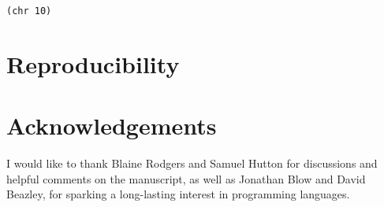 \documentclass[aip,jcp,reprint]{revtex4-1}
\let\tt\texttt
\newcommand\psll{\texttt{psll}\xspace}
\newcommand{\ilpsll}[1]{\lstinline[language=psll,columns=flexible]{#1}}
\begin{document}
\lipsum[11-15]
\ilpsll{(chr 10)}
\section*{Reproducibility}


\section*{Acknowledgements}

I would like to thank Blaine Rodgers and Samuel Hutton for discussions and helpful comments on the manuscript, as well as Jonathan Blow and David Beazley, for sparking a long-lasting interest in programming languages.
 
\nocite{*}


\end{document}
